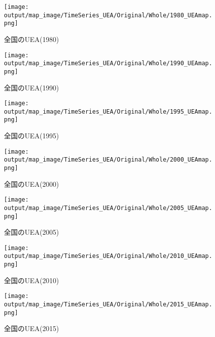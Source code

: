 \documentclass{ltjsarticle}
\begin{document}
\begin{figure}[pbth]
  \centering
  \texttt{[image: output/map\_image/TimeSeries\_UEA/Original/Whole/1980\_UEAmap.png]}
  \caption{\label{ori:1980UEA:who}全国のUEA(1980)}
\end{figure}
\begin{figure}[pbth]
  \centering
  \texttt{[image: output/map\_image/TimeSeries\_UEA/Original/Whole/1990\_UEAmap.png]}
  \caption{\label{ori:1990UEA:who}全国のUEA(1990)}
\end{figure}
\begin{figure}[pbth]
  \centering
  \texttt{[image: output/map\_image/TimeSeries\_UEA/Original/Whole/1995\_UEAmap.png]}
  \caption{\label{ori:1995UEA:who}全国のUEA(1995)}
\end{figure}
\begin{figure}[pbth]
  \centering
  \texttt{[image: output/map\_image/TimeSeries\_UEA/Original/Whole/2000\_UEAmap.png]}
  \caption{\label{ori:2000UEA:who}全国のUEA(2000)}
\end{figure}
\begin{figure}[pbth]
  \centering
  \texttt{[image: output/map\_image/TimeSeries\_UEA/Original/Whole/2005\_UEAmap.png]}
  \caption{\label{ori:2005UEA:who}全国のUEA(2005)}
\end{figure}
\begin{figure}[pbth]
  \centering
  \texttt{[image: output/map\_image/TimeSeries\_UEA/Original/Whole/2010\_UEAmap.png]}
  \caption{\label{ori:2010UEA:who}全国のUEA(2010)}
\end{figure}
\begin{figure}[pbth]
  \centering
  \texttt{[image: output/map\_image/TimeSeries\_UEA/Original/Whole/2015\_UEAmap.png]}
  \caption{\label{ori:2015UEA:who}全国のUEA(2015)}
\end{figure}
\end{document}
